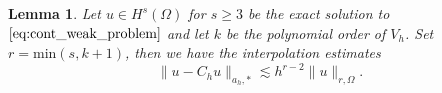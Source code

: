 \documentclass[11pt]{article}
\newtheorem{lemma}[theorem]{Lemma}
\theoremstyle{remark}
\renewcommand{\ge}{\geqslant}
\numberwithin{equation}{section}
\begin{document}

\begin{lemma}
    \label{lemma:astar_estimate}
    Let $u \in H^{s}( \Omega ) $ for $s\ge 3$ be the exact solution to $\eqref{eq:cont_weak_problem} $ and let $k$ be the polynomial order of $V_{h}$. Set $r = \mathrm{min} ( s, k+1)$, then we have the interpolation estimates
    \begin{equation}
    \|  u - C_{h}u \|_{ a_{h},*  }^{  } \lesssim h^{r-2} \| u \|_{ r, \Omega  }^{  }.
    \end{equation}
\end{lemma}
\end{document}
